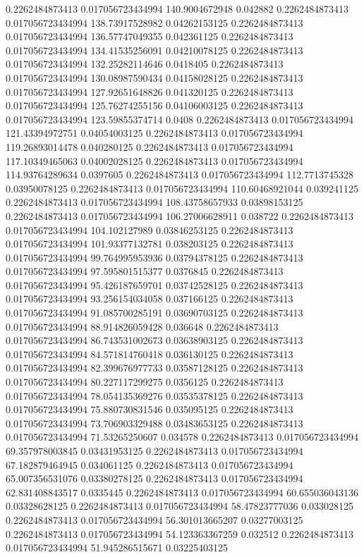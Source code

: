 0.2262484873413 0.017056723434994 140.9004672948 0.042882
0.2262484873413 0.017056723434994 138.73917528982 0.04262153125
0.2262484873413 0.017056723434994 136.57747049355 0.042361125
0.2262484873413 0.017056723434994 134.41535256091 0.04210078125
0.2262484873413 0.017056723434994 132.25282114646 0.0418405
0.2262484873413 0.017056723434994 130.08987590434 0.04158028125
0.2262484873413 0.017056723434994 127.92651648826 0.041320125
0.2262484873413 0.017056723434994 125.76274255156 0.04106003125
0.2262484873413 0.017056723434994 123.59855374714 0.0408
0.2262484873413 0.017056723434994 121.43394972751 0.04054003125
0.2262484873413 0.017056723434994 119.26893014478 0.040280125
0.2262484873413 0.017056723434994 117.10349465063 0.04002028125
0.2262484873413 0.017056723434994 114.93764289634 0.0397605
0.2262484873413 0.017056723434994 112.7713745328 0.03950078125
0.2262484873413 0.017056723434994 110.60468921044 0.039241125
0.2262484873413 0.017056723434994 108.43758657933 0.03898153125
0.2262484873413 0.017056723434994 106.27006628911 0.038722
0.2262484873413 0.017056723434994 104.102127989 0.03846253125
0.2262484873413 0.017056723434994 101.93377132781 0.038203125
0.2262484873413 0.017056723434994 99.764995953936 0.03794378125
0.2262484873413 0.017056723434994 97.595801515377 0.0376845
0.2262484873413 0.017056723434994 95.426187659701 0.03742528125
0.2262484873413 0.017056723434994 93.256154034058 0.037166125
0.2262484873413 0.017056723434994 91.085700285191 0.03690703125
0.2262484873413 0.017056723434994 88.914826059428 0.036648
0.2262484873413 0.017056723434994 86.743531002673 0.03638903125
0.2262484873413 0.017056723434994 84.571814760418 0.036130125
0.2262484873413 0.017056723434994 82.399676977733 0.03587128125
0.2262484873413 0.017056723434994 80.227117299275 0.0356125
0.2262484873413 0.017056723434994 78.054135369276 0.03535378125
0.2262484873413 0.017056723434994 75.880730831546 0.035095125
0.2262484873413 0.017056723434994 73.706903329488 0.03483653125
0.2262484873413 0.017056723434994 71.53265250607 0.034578
0.2262484873413 0.017056723434994 69.357978003845 0.03431953125
0.2262484873413 0.017056723434994 67.182879464945 0.034061125
0.2262484873413 0.017056723434994 65.007356531076 0.03380278125
0.2262484873413 0.017056723434994 62.831408843517 0.0335445
0.2262484873413 0.017056723434994 60.655036043136 0.03328628125
0.2262484873413 0.017056723434994 58.47823777036 0.033028125
0.2262484873413 0.017056723434994 56.301013665207 0.03277003125
0.2262484873413 0.017056723434994 54.123363367259 0.032512
0.2262484873413 0.017056723434994 51.945286515671 0.03225403125
